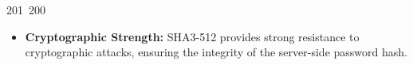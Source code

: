 201~200~\documentclass{article}
\begin{document}
\begin{itemize}
	                                                                                                                                                                                                                                                                                                	                                                                                                                                        	    	                                                                                                	                                                                                                                                                                                                                                                                                                                                	                                                                        	                                                                        	                                                                                                                                        	                                                                                                                                \item \textbf{Cryptographic Strength:} SHA3-512 provides strong resistance to cryptographic attacks, ensuring the integrity of the server-side password hash.
	                                                                                                                                                                                                                                                                                                	                                                                                                                                        	    	                                                                                                	                                                                                                                                                                                                                                                                                                                                	                                                                        	                                                                        	                                                                                                                                        	                                                                                                                                \end{itemize}
\end{document}
